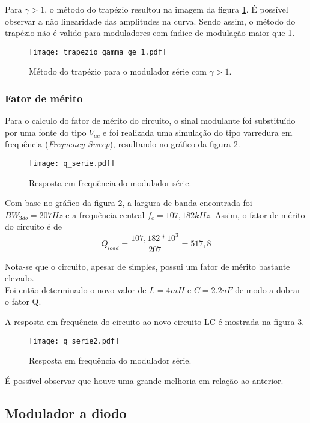 Para $\gamma > 1$, o método do trapézio resultou na imagem da figura \ref{f_trapezio_gamma_ge_1}. É possível observar a não linearidade das amplitudes na curva. Sendo assim, o método do trapézio não é valido para moduladores com índice de modulação maior que 1.

\begin{figure}[H]
    \centering
    \caption{Método do trapézio para o modulador série com $\gamma > 1$.}
    \texttt{[image: trapezio\_gamma\_ge\_1.pdf]}
    \label{f_trapezio_gamma_ge_1}
\end{figure}

\subsubsection{Fator de mérito}

Para o calculo do fator de mérito do circuito, o sinal modulante foi substituído por uma fonte do tipo $V_{ac}$ e foi realizada uma simulação do tipo varredura em frequência (\textit{Frequency Sweep}), resultando no gráfico da figura \ref{f_q_serie}.

\begin{figure}[H]
    \centering
    \caption{Resposta em frequência do modulador série.}
    \texttt{[image: q\_serie.pdf]}
    \label{f_q_serie}
\end{figure}

Com base no gráfico da figura \ref{f_q_serie}, a largura de banda encontrada foi $BW_{3db} = 207 Hz$ e a frequência central $f_c = 107,182 kHz$. Assim, o fator de mérito do circuito é de
\[
Q_{load} = \frac{107,182*10^3}{207} = 517,8
\]

Nota-se que o circuito, apesar de simples, possui um fator de mérito bastante elevado.\\

Foi então determinado o novo valor de $L = 4mH$ e $C = 2.2uF$ de modo a dobrar o fator Q.

A resposta em frequência do circuito ao novo circuito LC é mostrada na figura \ref{f_q_serie2}.

\begin{figure}[H]
    \centering
    \caption{Resposta em frequência do modulador série.}
    \texttt{[image: q\_serie2.pdf]}
    \label{f_q_serie2}
\end{figure}

É possível observar que houve uma grande melhoria em relação ao anterior.


\subsection{Modulador a diodo}

